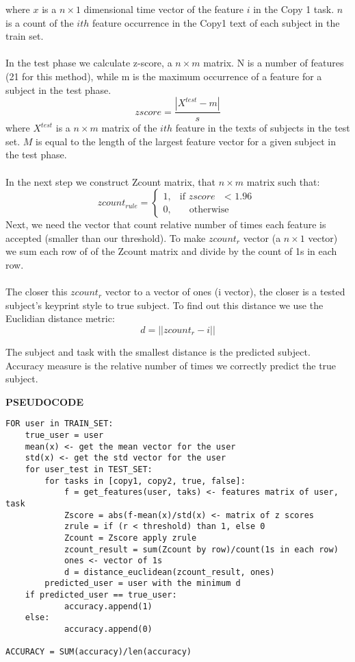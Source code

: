 \documentclass[12pt,a4]{article}
\begin{document}
where $x$ is a $n\times 1$ dimensional time vector of the feature $i$ in the Copy 1 task. $n$ is a count of the $ith$ feature occurrence in the Copy1 text of each subject in the train set.\\
\\
In the test phase we calculate z-score, a $n \times m$ matrix. N is a number of features (21 for this method), while m is the maximum occurrence of a feature for a subject in the test phase.
$$
zscore = \frac{|X^{test} - m|}{s}
$$
where $X^{test}$ is a $n\times m$ matrix of the $ith$ feature in the texts of subjects in the test set. $M$ is equal to the length of the largest feature vector for a given subject in the test phase. \\
\\
In the next step we construct Zcount matrix, that $n \times m$ matrix such that:
$$
zcount_{rule} = \begin{cases} 1, & \mbox{if } zscore \mbox{ $<$ 1.96} \\ 0, & \mbox{ } \mbox{ otherwise} \end{cases}
$$
Next, we need the vector that count relative number of times each feature is accepted (smaller than our threshold). To make $zcount_r$ vector (a $n \times 1$ vector) we sum each row of of the Zcount matrix and divide by the count of 1s in each row.
\\
\\
The closer this $zcount_r$ vector to a vector of ones (i vector), the closer is a tested subject's keyprint style to true subject. To find out this distance we use the Euclidian distance metric: 
$$
d = ||zcount_r - i||
$$

The subject and task with the smallest distance is the predicted subject. Accuracy measure is the relative number of times we correctly predict the true subject.

\newpage
\small\textbf{PSEUDOCODE}

\normalsize

\begin{lstlisting}
FOR user in TRAIN_SET:
    true_user = user
    mean(x) <- get the mean vector for the user
    std(x) <- get the std vector for the user
    for user_test in TEST_SET:
        for tasks in [copy1, copy2, true, false]:
            f = get_features(user, taks) <- features matrix of user, task
            Zscore = abs(f-mean(x)/std(x) <- matrix of z scores
            zrule = if (r < threshold) than 1, else 0
            Zcount = Zscore apply zrule
            zcount_result = sum(Zcount by row)/count(1s in each row)
            ones <- vector of 1s
            d = distance_euclidean(zcount_result, ones)
        predicted_user = user with the minimum d
    if predicted_user == true_user:
            accuracy.append(1)
    else:
            accuracy.append(0)
            
ACCURACY = SUM(accuracy)/len(accuracy)

\end{lstlisting}
\end{document}
